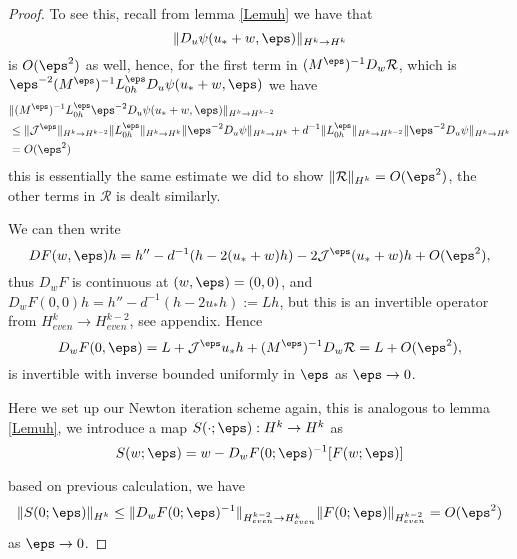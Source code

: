 \begin{proof}
To see this, recall from lemma \ref{Lemuh} we have that 
\[
\| D_u\psi(u_*+w,\eps) \|_{H^k \to H^k}
\] is $O(\eps^2)$ as well, hence, for the first term in $(M^{\eps})^{-1}D_w\mathcal{R}$, which is $\eps^{-2}(M^{\eps})^{-1}L_{0h}^{\eps}D_u\psi(u_*+w,\eps)$ we have
\begin{align*}
& \|(M^\eps)^{-1}L_{0h}^\eps \eps^{-2}D_u\psi(u_*+w,\eps) \|_{H^k \to H^{k-2}}  \\
&\le \|\mathcal{J}^{\eps}\|_{H^k \to H^{k-2}}\| L_{0h}^{\eps}\|_{H^k\to H^k}\|\eps^{-2}D_u\psi\|_{H^k \to H^k}+d^{-1}\|L_{0h}^{\eps}\|_{H^k \to H^{k-2}}\|\eps^{-2}D_u\psi\|_{H^k \to H^k}\\
& = O(\eps^2)
\end{align*}
this is essentially the same estimate we did to show $\|\mathcal{R}\|_{H^k} = O(\eps^2)$, the other terms in $\mathcal{R}$ is dealt similarly.

We can then write
\[
DF(w,\eps)h = h''-d^{-1}(h-2(u_*+w)h)-2\mathcal{J}^\eps(u_*+w)h+O(\eps^2),
\]
thus $D_wF$ is continuous at $(w,\eps) = (0,0)$, and $D_wF(0,0) h = h''-d^{-1}(h-2u_* h) := L h$, but this is an invertible operator from $H^k_{even} \to H^{k-2}_{even}$, see appendix. Hence 
 \[
 D_wF(0,\eps) = L+\mathcal{J}^{\eps} u_*h+(M^{\eps})^{-1}D_w\mathcal{R} = L+O(\eps^2),
 \] 
 is invertible with inverse bounded uniformly in $\eps$ as $\eps \to 0$.



\iffalse
 The continuity of $F(w,\eps)$ in $\eps$ follows from the same estimate in item (iv), more precisely, we have
\[
\|F(w,\eps_1)-F(w,\eps_2) \|\le \|(\mathcal{J}_{\eps_1}-\mathcal{J}_{\eps_2})(w-2u_*w-w^2+du_*^{''})\| + O((\eps_1^2M_{\eps_1}^{-1}-\eps_2^2M_{\eps_2}^{-1})(w+u_*))
\]
but we have shown $(\mathcal{J}_{\eps_1}-\mathcal{J}_{\eps_2}) \to 0$ as an operator from $H^2$ to $L^2$ and as $\eps_1\to \eps_2$, and the same holds for the remainder term. So we have continuity in $\eps$.

Hence, we have shown that $\|F(w,\epsilon)\|_{L^2} \to 0$ as $\eps \to 0$, and $\|D_wF(0,\eps)\|_{H^2_{even} \to L^2_{even}}$ is invertible with inverse uniformly bounded in $\eps$.
\fi
 Here we set up our Newton iteration scheme again, this is analogous to lemma \ref{Lemuh}, we introduce a map $S(\cdot; \eps) : H^k \to H^{k}$ as
\[
S(w;\eps) = w - D_wF(0; \eps)^{-1}[F(w;\eps)]
\]

based on previous calculation, we have 
\[
\|S(0;\eps)\|_{H^k} \le \|D_wF(0;\eps)^{-1}\|_{H^{k-2}_{even} \to H^k_{even}}\|F(0;\eps)\|_{H^{k-2}_{even}} = O(\eps^2)
\]
as $\eps \to 0$.


\end{proof}
